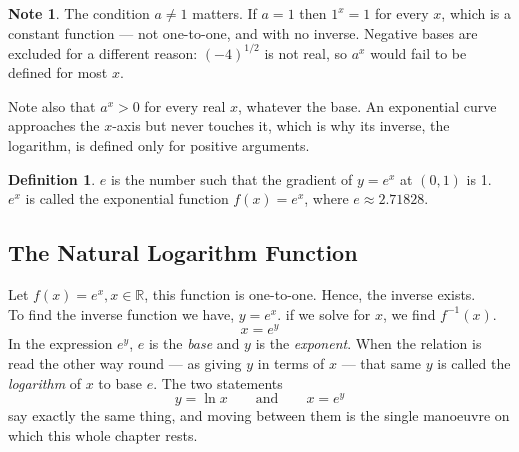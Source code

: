 \documentclass[11pt,a4paper]{article}
\theoremstyle{definition}
\newtheorem{definition}[thm]{Definition}
\newtheorem{note}[thm]{Note}
\begin{document}
\begin{note}
The condition $a\neq 1$ matters. If $a=1$ then $1^{x}=1$ for every $x$, which is a
constant function --- not one-to-one, and with no inverse. Negative bases are
excluded for a different reason: $(-4)^{1/2}$ is not real, so $a^{x}$ would fail to
be defined for most $x$.

Note also that $a^{x}>0$ for every real $x$, whatever the base. An exponential
curve approaches the $x$-axis but never touches it, which is why its inverse, the
logarithm, is defined only for positive arguments.
\end{note}

\begin{definition}

$e$ is the number such that the gradient of $y=e^x$ at $(0,1)$ is 1.\\

$e^x$ is called the exponential function $f(x)=e^x$, where $e\approx 2.71828$.
\end{definition}
\subsection{The Natural Logarithm Function}

Let $f(x)=e^x, x\in \mathbb{R}$, this function is one-to-one. Hence, the inverse exists.\\
To find the inverse function we have, $y=e^x$. if we solve for $x$, we find $f^{-1}(x)$. $$x=e^y$$
In the expression $e^{y}$, $e$ is the \emph{base} and $y$ is the \emph{exponent}.
When the relation is read the other way round --- as giving $y$ in terms of $x$ ---
that same $y$ is called the \emph{logarithm} of $x$ to base $e$. The two statements
$$y=\ln x \qquad \text{and}\qquad  x=e^{y}$$
say exactly the same thing, and moving between them is the single manoeuvre on
which this whole chapter rests.\\\\
\end{document}

